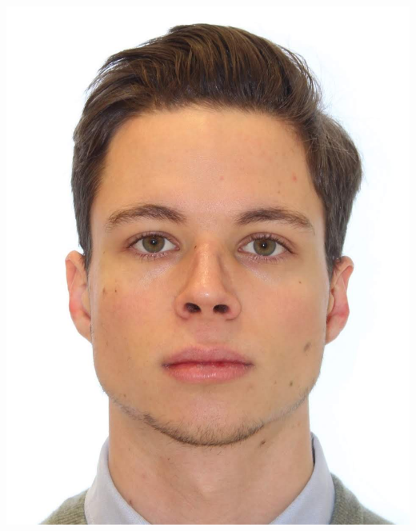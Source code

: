 \documentclass{ResumeTemplate}
\begin{document}
    \fontsize{12}{12}\selectfont

    \raggedright\begin{minipage}[c]{0.64\linewidth}
        \centering{}
    \end{minipage}
    \hspace{0.01\linewidth}
    \raggedright\begin{minipage}[c]{0.33\linewidth} 
        \centering\includegraphics[width=0.5\linewidth]{me}
    \end{minipage}
    \vspace{0.5cm}
\end{document}
